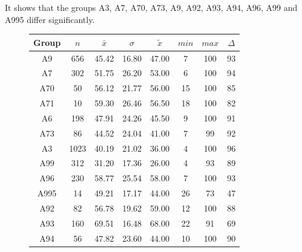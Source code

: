 It shows that the groups A3, A7, A70, A73, A9, A92, A93, A94, A96, A99 and A995 differ significantly.
\begin{figure}[ht!]
	\centering
	\begin{minipage}{0.5\textwidth}
		\tiny
		\centering
		\begin{tabular}{c|c|c|c|c|c|c|c}
			\toprule
			Group & $n$ & $\bar{x}$ & $\sigma$ & $\tilde{x}$ & $min$ & $max$ & $\Delta$ \\
			\midrule
			A9   & 656  & 45.42 & 16.80 & 47.00 & 7  & 100 & 93 \\ 
			A7   & 302  & 51.75 & 26.20 & 53.00 & 6  & 100 & 94 \\ 
			A70  & 50   & 56.12 & 21.77 & 56.00 & 15 & 100 & 85 \\ 
			A71  & 10   & 59.30 & 26.46 & 56.50 & 18 & 100 & 82 \\ 
			A6   & 198  & 47.91 & 24.26 & 45.50 & 9  & 100 & 91 \\ 
			A73  & 86   & 44.52 & 24.04 & 41.00 & 7  & 99  & 92 \\ 
			A3   & 1023 & 40.19 & 21.02 & 36.00 & 4  & 100 & 96 \\ 
			A99  & 312  & 31.20 & 17.36 & 26.00 & 4  & 93  & 89 \\ 
			A96  & 230  & 58.77 & 25.54 & 58.00 & 7  & 100 & 93 \\ 
			A995 & 14   & 49.21 & 17.17 & 44.00 & 26 & 73  & 47 \\ 
			A92  & 82   & 56.78 & 19.62 & 59.00 & 12 & 100 & 88 \\ 
			A93  & 160  & 69.51 & 16.48 & 68.00 & 22 & 91  & 69 \\ 
			A94  & 56   & 47.82 & 23.60 & 44.00 & 10 & 100 & 90 \\ 
			\bottomrule
		\end{tabular}
		\label{tbl:descriptives_arbis_matched_Strasse_Cov}
	\end{minipage}%
	\begin{minipage}{0.55\textwidth}
\end{minipage}
\end{figure}
